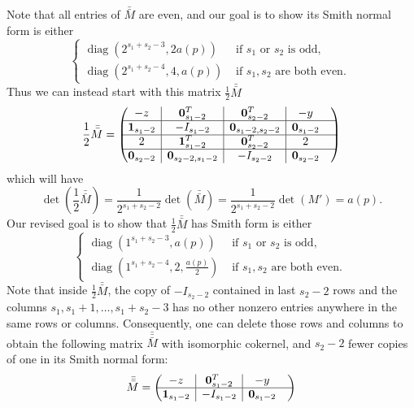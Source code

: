 \documentclass[10pt,reqno]{amsart}
\newcommand{\rvline}{\hspace*{-\arraycolsep}\vline\hspace*{-\arraycolsep}}
\DeclareMathOperator{\diag}{diag}
\def\onesvector{\mathbf{1}}
\def\zerovector{\mathbf{0}}
\begin{document}
\begin{enumerate}
\noindent Note that all entries of $\bar{\bar{M}}$ are even, and our goal is to show its Smith normal form is either
$$
\begin{cases}
  \diag(2^{s_1+s_2-3},2a(p)) & \text{ if }s_1\text{ or }s_2\text{ is odd},\\  
  \diag(2^{s_1+s_2-4},4,a(p)) & \text{ if }s_1,s_2\text{ are both even}.\
\end{cases}
$$
Thus we can instead start with this matrix $\frac{1}{2} \bar{\bar{M}}$ 
\begin{equation*}
\frac{1}{2} \bar{\bar{M}} =\begin{pmatrix}
-z & \rvline & \zerovector^T_{s_1-2} & \rvline &  \zerovector^T_{s_2-2} &\rvline &-y  &\\
\hline
\onesvector_{s_1-2} & \rvline & -I_{s_1-2} & \rvline &\zerovector_{s_1-2,s_2-2} &\rvline & \zerovector_{s_1-2} &\\
\hline
2  & \rvline &  \onesvector^T_{s_1-2} & \rvline & \zerovector^T_{s_2-2}& \rvline & 2   &\\
\hline
 \zerovector_{s_2-2} & \rvline & \zerovector_{s_2-2,s_1-2}& \rvline &-  I_{s_2-2}&\rvline & \zerovector_{s_2-2} &
\end{pmatrix}
\end{equation*}
which will have 
$$
\det
\left(\frac{1}{2} \bar{\bar{M}}\right)
=\frac{1}{2^{s_1+s_2-2}}\det(\bar{\bar{M}})
=\frac{1}{2^{s_1+s_2-2}}\det(M')
=a(p).
$$
Our revised goal is to show that $\frac{1}{2} \bar{\bar{M}}$ has Smith form is either
$$
\begin{cases}
  \diag(1^{s_1+s_2-3},a(p)) & \text{ if }s_1\text{ or }s_2\text{ is odd},\\  
  \diag(1^{s_1+s_2-4},2,\frac{a(p)}{2}) & \text{ if }s_1,s_2\text{ are both even}.\
\end{cases}
$$
Note that inside $\frac{1}{2} \bar{\bar{M}}$, the copy of $-I_{s_2-2}$ contained in last $s_2-2$ rows  and the columns $s_1,s_1+1,\ldots,s_1+s_2-3$
has no other nonzero entries anywhere in the same rows or columns.  Consequently, one can delete those rows and columns to obtain the following matrix $\bar{\bar{\bar{M}}}$ with isomorphic cokernel, and $s_2-2$ fewer copies of one in its Smith normal form:
\begin{equation*}
\bar{\bar{\bar{M}}} =\begin{pmatrix}
-z & \rvline & \zerovector^T_{s_1-2} & \rvline &-y  &\\
\hline
\onesvector_{s_1-2} & \rvline & -I_{s_1-2} &\rvline & \zerovector_{s_1-2} &\\

\end{pmatrix}
\end{equation*}
\end{enumerate}
\end{document}
